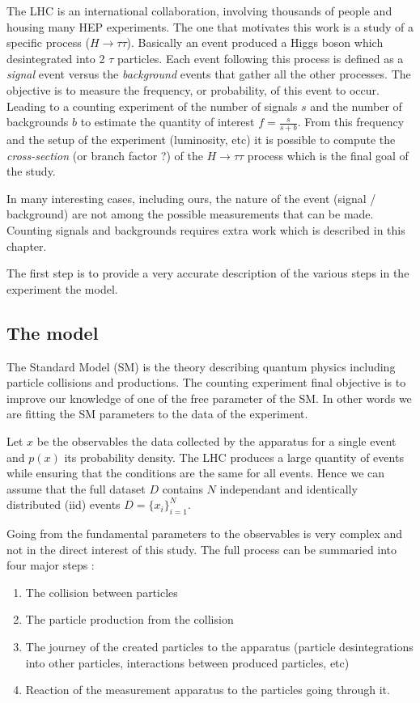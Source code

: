 The LHC is an international collaboration, involving thousands of people and housing many HEP experiments.
The one that motivates this work is a study of a specific process ($H \to \tau \tau$).
Basically an event produced a Higgs boson which desintegrated into 2 $\tau$ particles.
Each event following this process is defined as a \emph{signal} event versus the \emph{background} events that gather all the other processes.
The objective is to measure the frequency, or probability, of this event to occur.
Leading to a counting experiment of the number of signals $s$ and the number of backgrounds $b$ to estimate the quantity of interest $f = \frac{s}{s + b}$.
From this frequency and the setup of the experiment (luminosity, etc) it is possible to compute the \emph{cross-section} (or branch factor ?) of the $H \to \tau \tau$ process which is the final goal of the study.

In many interesting cases, including ours, the nature of the event (signal / background) are not among the possible measurements that can be made.
Counting signals and backgrounds requires extra work which is described in this chapter.

The first step is to provide a very accurate description of the various steps in the experiment \ie the model.






\subsection{The model} %
\label{sub:the_model}

The Standard Model \needcite (SM) is the theory describing quantum physics including particle collisions and productions.
The counting experiment final objective is to improve our knowledge of one of the free parameter of the SM.
In other words we are fitting the SM parameters to the data of the experiment.

Let $x$ be the observables \ie the data collected by the apparatus for a single event and $p(x)$ its probability density.
The LHC produces a large quantity of events while ensuring that the conditions are the same for all events.
Hence we can assume that the full dataset $D$ contains $N$ independant and identically distributed (iid) events $D = \{x_i\}_{i=1}^N$.

Going from the fundamental parameters to the observables is very complex and not in the direct interest of this study.
The full process can be summaried into four major steps :
\begin{enumerate}
	\item The collision between particles
	\item The particle production from the collision
	\item The journey of the created particles to the apparatus (particle desintegrations into other particles, interactions between produced particles, etc)
	\item Reaction of the measurement apparatus to the particles going through it.
\end{enumerate}


